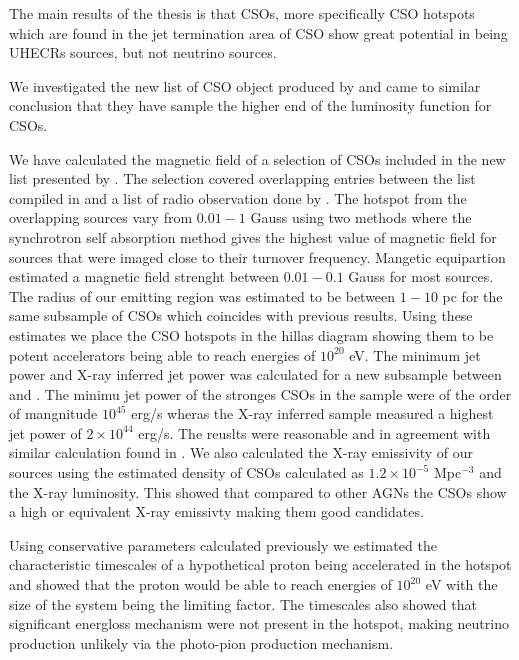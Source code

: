 The main results of the thesis is that CSOs, more specifically CSO hotspots which are found in the jet termination area of CSO show great potential in being UHECRs sources, but not neutrino sources. 

We investigated the new list of CSO object produced by \cite{kiehlmann2023compact} and came to similar conclusion that they have sample the higher end of the luminosity function for CSOs. 

We have calculated the magnetic field of a selection of CSOs  included in the new list presented by \cite{kiehlmann2023compact}. The selection covered overlapping entries between the list compiled in \cite{kiehlmann2023compact} and a list of radio observation done by \cite{nrao1996}.  The hotspot from the overlapping sources vary from $0.01-1$ Gauss using two methods where the synchrotron self absorption method gives the highest value of magnetic field for sources that were imaged close to their turnover frequency. Mangetic equipartion estimated a magnetic field strenght between $0.01-0.1$ Gauss for most sources. The radius of our emitting region was estimated to be between $1-10$ pc for the same subsample of CSOs which coincides with previous results. Using these estimates we place the CSO hotspots in the hillas diagram showing them to be potent accelerators being able to reach energies of $10^{20}$ eV.
The minimum jet power and X-ray inferred jet power was calculated for a new subsample between \cite{kiehlmann2023compact} and \cite{W_jtowicz_2020}.  The minimu jet power of the stronges CSOs in the sample were of the order of mangnitude $10^{45}$ erg/s wheras the X-ray inferred sample measured a highest jet power of $2\times 10^{44}$ erg/s. The reuslts were reasonable and in agreement with  similar calculation found in \cite{W_jtowicz_2020}. We also calculated the X-ray emissivity of our sources using the estimated density of CSOs calculated as $1.2 \times 10^{-5}$ Mpc$^{-3}$ and the X-ray luminosity. This showed that compared to other AGNs the CSOs show a high or equivalent X-ray emissivty making them good candidates. 

Using conservative parameters calculated previously we estimated the characteristic timescales of a hypothetical proton being accelerated in the hotspot and showed that the proton would be able to reach energies of $10^{20}$ eV with the size of the system being the limiting factor. The timescales also showed that significant energloss mechanism were not present in the hotspot, making neutrino production unlikely via the photo-pion production mechanism.

